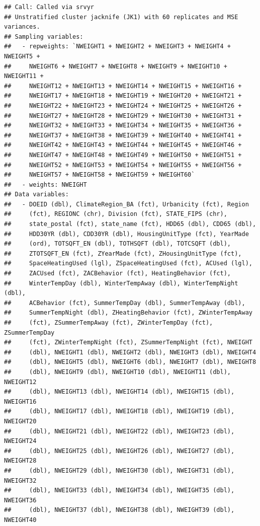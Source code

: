 \documentclass[
]{krantz}
\begin{document}
\begin{verbatim}
## Call: Called via srvyr
## Unstratified cluster jacknife (JK1) with 60 replicates and MSE variances.
## Sampling variables:
##   - repweights: `NWEIGHT1 + NWEIGHT2 + NWEIGHT3 + NWEIGHT4 + NWEIGHT5 +
##     NWEIGHT6 + NWEIGHT7 + NWEIGHT8 + NWEIGHT9 + NWEIGHT10 + NWEIGHT11 +
##     NWEIGHT12 + NWEIGHT13 + NWEIGHT14 + NWEIGHT15 + NWEIGHT16 +
##     NWEIGHT17 + NWEIGHT18 + NWEIGHT19 + NWEIGHT20 + NWEIGHT21 +
##     NWEIGHT22 + NWEIGHT23 + NWEIGHT24 + NWEIGHT25 + NWEIGHT26 +
##     NWEIGHT27 + NWEIGHT28 + NWEIGHT29 + NWEIGHT30 + NWEIGHT31 +
##     NWEIGHT32 + NWEIGHT33 + NWEIGHT34 + NWEIGHT35 + NWEIGHT36 +
##     NWEIGHT37 + NWEIGHT38 + NWEIGHT39 + NWEIGHT40 + NWEIGHT41 +
##     NWEIGHT42 + NWEIGHT43 + NWEIGHT44 + NWEIGHT45 + NWEIGHT46 +
##     NWEIGHT47 + NWEIGHT48 + NWEIGHT49 + NWEIGHT50 + NWEIGHT51 +
##     NWEIGHT52 + NWEIGHT53 + NWEIGHT54 + NWEIGHT55 + NWEIGHT56 +
##     NWEIGHT57 + NWEIGHT58 + NWEIGHT59 + NWEIGHT60` 
##   - weights: NWEIGHT 
## Data variables: 
##   - DOEID (dbl), ClimateRegion_BA (fct), Urbanicity (fct), Region
##     (fct), REGIONC (chr), Division (fct), STATE_FIPS (chr),
##     state_postal (fct), state_name (fct), HDD65 (dbl), CDD65 (dbl),
##     HDD30YR (dbl), CDD30YR (dbl), HousingUnitType (fct), YearMade
##     (ord), TOTSQFT_EN (dbl), TOTHSQFT (dbl), TOTCSQFT (dbl),
##     ZTOTSQFT_EN (fct), ZYearMade (fct), ZHousingUnitType (fct),
##     SpaceHeatingUsed (lgl), ZSpaceHeatingUsed (fct), ACUsed (lgl),
##     ZACUsed (fct), ZACBehavior (fct), HeatingBehavior (fct),
##     WinterTempDay (dbl), WinterTempAway (dbl), WinterTempNight (dbl),
##     ACBehavior (fct), SummerTempDay (dbl), SummerTempAway (dbl),
##     SummerTempNight (dbl), ZHeatingBehavior (fct), ZWinterTempAway
##     (fct), ZSummerTempAway (fct), ZWinterTempDay (fct), ZSummerTempDay
##     (fct), ZWinterTempNight (fct), ZSummerTempNight (fct), NWEIGHT
##     (dbl), NWEIGHT1 (dbl), NWEIGHT2 (dbl), NWEIGHT3 (dbl), NWEIGHT4
##     (dbl), NWEIGHT5 (dbl), NWEIGHT6 (dbl), NWEIGHT7 (dbl), NWEIGHT8
##     (dbl), NWEIGHT9 (dbl), NWEIGHT10 (dbl), NWEIGHT11 (dbl), NWEIGHT12
##     (dbl), NWEIGHT13 (dbl), NWEIGHT14 (dbl), NWEIGHT15 (dbl), NWEIGHT16
##     (dbl), NWEIGHT17 (dbl), NWEIGHT18 (dbl), NWEIGHT19 (dbl), NWEIGHT20
##     (dbl), NWEIGHT21 (dbl), NWEIGHT22 (dbl), NWEIGHT23 (dbl), NWEIGHT24
##     (dbl), NWEIGHT25 (dbl), NWEIGHT26 (dbl), NWEIGHT27 (dbl), NWEIGHT28
##     (dbl), NWEIGHT29 (dbl), NWEIGHT30 (dbl), NWEIGHT31 (dbl), NWEIGHT32
##     (dbl), NWEIGHT33 (dbl), NWEIGHT34 (dbl), NWEIGHT35 (dbl), NWEIGHT36
##     (dbl), NWEIGHT37 (dbl), NWEIGHT38 (dbl), NWEIGHT39 (dbl), NWEIGHT40

\end{verbatim}
\end{document}
